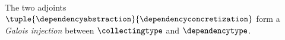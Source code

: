 ~

The two adjoints $\tuple{\dependencyabstraction}{\dependencyconcretization}$ form a \emph{Galois injection} between $\collectingtype$ and $\dependencytype$.
